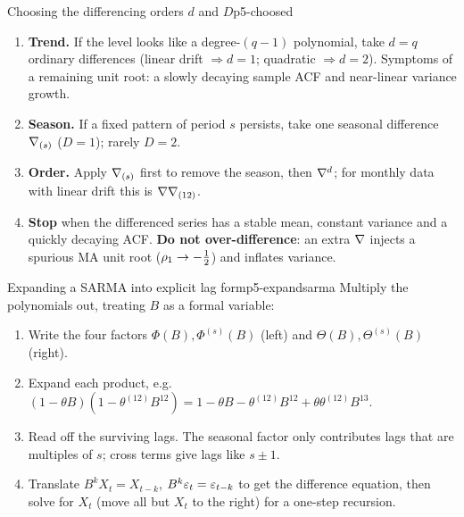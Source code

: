 \begin{keytech}{Choosing the differencing orders $d$ and $D$}{p5-choosed}
\begin{enumerate}
  \item \textbf{Trend.} If the level looks like a degree-$(q-1)$ polynomial,
        take $d=q$ ordinary differences (linear drift $\Rightarrow d=1$;
        quadratic $\Rightarrow d=2$). Symptoms of a remaining unit root: a
        slowly decaying sample ACF and near-linear variance growth.
  \item \textbf{Season.} If a fixed pattern of period $s$ persists, take one
        seasonal difference $\nabla_{(s)}$ ($D=1$); rarely $D=2$.
  \item \textbf{Order.} Apply $\nabla_{(s)}$ first to remove the season, then
        $\nabla^{d}$; for monthly data with linear drift this is
        $\nabla\nabla_{(12)}$.
  \item \textbf{Stop} when the differenced series has a stable mean, constant
        variance and a quickly decaying ACF. \textbf{Do not over-difference}:
        an extra $\nabla$ injects a spurious MA unit root
        ($\rho_1\to-\tfrac12$) and inflates variance.
\end{enumerate}
\end{keytech}

\begin{keytech}{Expanding a SARMA into explicit lag form}{p5-expandsarma}
Multiply the polynomials out, treating $B$ as a formal variable:
\begin{enumerate}
  \item Write the four factors $\Phi(B),\Phi^{(s)}(B)$ (left) and
        $\Theta(B),\Theta^{(s)}(B)$ (right).
  \item Expand each product, e.g.
        $(1-\theta B)(1-\theta^{(12)}B^{12})
        =1-\theta B-\theta^{(12)}B^{12}+\theta\theta^{(12)}B^{13}$.
  \item Read off the surviving lags. The seasonal factor only contributes lags
        that are multiples of $s$; cross terms give lags like $s\pm1$.
  \item Translate $B^{k}X_t=X_{t-k}$, $B^{k}\varepsilon_t=\varepsilon_{t-k}$ to get the
        difference equation, then solve for $X_t$ (move all but $X_t$ to the
        right) for a one-step recursion.
\end{enumerate}
\end{keytech}


